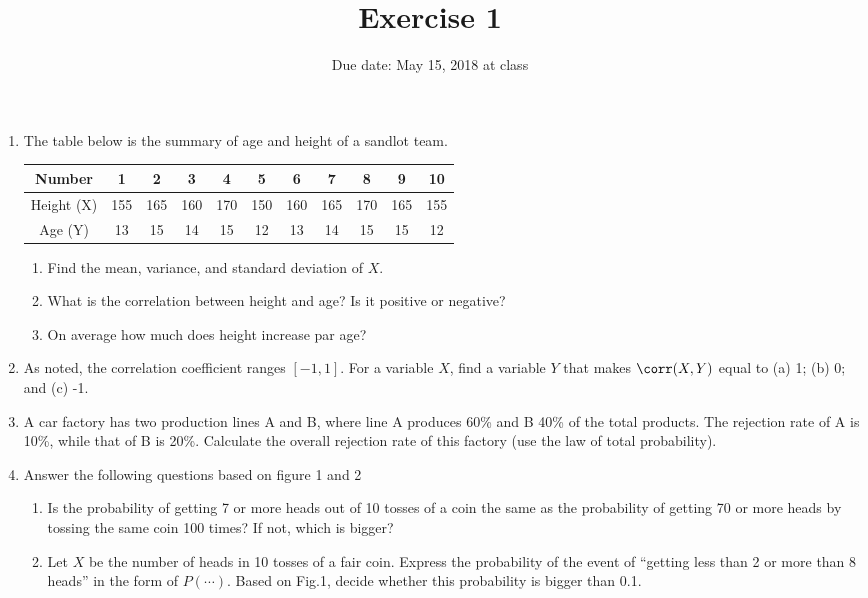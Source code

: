 \documentclass[11pt]{article}
\date{Due date: May 15, 2018 at class}
\title{Exercise 1}
\begin{document}
\maketitle
\begin{enumerate}
\item The table below is the summary of age and height of a sandlot team. 
\begin{center}
\begin{tabular}[t]{ccccccccccc}
Number  & 1   & 2   & 3   & 4   & 5   & 6   & 7   & 8   & 9   & 10   \\ \hline 
Height (X) & 155 & 165 & 160 & 170 & 150 & 160 & 165 & 170 & 165 & 155  \\
Age (Y) & 13  & 15  & 14  & 15  & 12  & 13  & 14  & 15  & 15  & 12 
\end{tabular}
\end{center}
\begin{enumerate}
\item Find the mean, variance, and standard deviation of $X$.
\item What is the correlation between height and age? Is it positive or negative?
\item On average how much does height increase par age?
\end{enumerate}

\item As noted, the correlation coefficient ranges $[-1,1]$. For a variable $X$, find a variable $Y$ that makes $\corr(X,Y)$ equal to (a) 1; (b) 0; and (c) -1.

\item A car factory has two production lines A and B, where line A produces 60\% and B 40\% of the total products. The rejection rate of A is 10\%, while that of B is 20\%. Calculate the overall rejection rate of this factory (use the law of total probability).

\item Answer the following questions based on figure 1 and 2
\begin{enumerate}
\item Is the probability of getting 7 or more heads out of 10 tosses of a coin the same as the probability of getting 70 or more heads by tossing the same coin 100 times? If not, which is bigger?
\item Let $X$ be the number of heads in 10 tosses of a fair coin. Express the probability of the event of ``getting less than 2 or more than 8 heads'' in the form of $P(\cdots)$. Based on Fig.1, decide whether this probability is bigger than 0.1.
\end{enumerate}
\end{enumerate}
\end{document}
